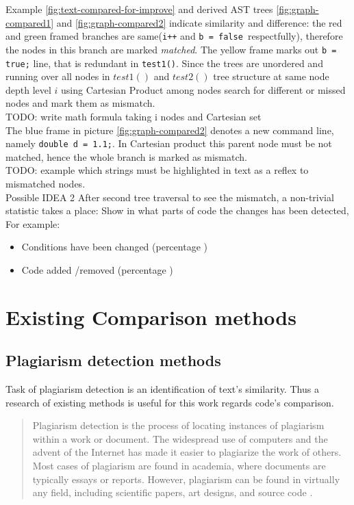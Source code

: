 \documentclass{report}
\begin{document}
Example \ref{fig:text-compared-for-improve} and derived AST trees \ref{fig:graph-compared1} and  \ref{fig:graph-compared2} indicate similarity and difference: the red and green framed branches are same(\texttt{i++} and \texttt{b = false }respectfully), therefore the nodes in this branch are marked \emph{matched}. The yellow frame marks out \texttt{b = true;} line, that is redundant in \texttt{test1()}. Since the trees are unordered and running over all nodes in $test1()$ and $test2()$ tree structure at same node depth level $i$ using Cartesian Product among nodes search for different or missed nodes and mark them as mismatch.
\\
TODO: write math formula taking i nodes and Cartesian set
\\

The blue frame in picture \ref{fig:graph-compared2} denotes a new command line, namely \texttt{double d = 1.1;}. In Cartesian product this parent node must be not matched, hence the whole branch is marked as mismatch. \\
TODO: example which strings must be highlighted in text as a reflex to mismatched nodes.
\\
Possible IDEA 2
After second tree traversal to see the mismatch, a non-trivial statistic takes a place:
Show in what parts of code the changes has been detected, For example: 
\begin{itemize}
	\item Conditions have been changed (percentage )
	\item Code added /removed (percentage )
\end{itemize}

\chapter{Existing Comparison methods}
\section{Plagiarism detection methods}
\label{sec: plagiarism_methods}

Task of plagiarism detection is an identification of text's similarity. Thus a research of existing methods is useful for this work regards code's comparison.
\begin{quote} Plagiarism detection is the process of locating instances of plagiarism within a work or document. The widespread use of computers and the advent of the Internet has made it easier to plagiarize the work of others. Most cases of plagiarism are found in academia, where documents are typically essays or reports. However, plagiarism can be found in virtually any field, including scientific papers, art designs, and source code \cite{wiki_plagiarism}. \end{quote}
\end{document}
